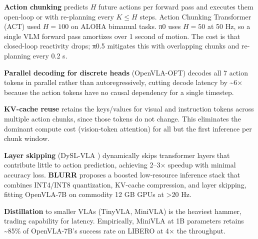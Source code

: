 \documentclass{article}
\begin{document}
\textbf{Action chunking} \cite{zhao2023learningfinegraine,black20240avisionlanguageac} predicts \(H\) future actions per forward pass and executes them open-loop or with re-planning every \(K \le H\) steps. Action Chunking Transformer (ACT) used \(H=100\) on ALOHA bimanual tasks. π0 uses \(H = 50\) at 50 Hz, so a single VLM forward pass amortizes over 1 second of motion. The cost is that closed-loop reactivity drops; π0.5 mitigates this with overlapping chunks and re-planning every 0.2 s.

\textbf{Parallel decoding for discrete heads} (OpenVLA-OFT) decodes all 7 action tokens in parallel rather than autoregressively, cutting decode latency by \textasciitilde6× because the action tokens have no causal dependency for a single timestep.

\textbf{KV-cache reuse} retains the keys/values for visual and instruction tokens across multiple action chunks, since those tokens do not change. This eliminates the dominant compute cost (vision-token attention) for all but the first inference per chunk window.

\textbf{Layer skipping} (DySL-VLA \cite{yang2026dyslvlaefficientvi}) dynamically skips transformer layers that contribute little to action prediction, achieving 2--3× speedup with minimal accuracy loss. \textbf{BLURR} \cite{ma2025blurraboostedlowre} proposes a boosted low-resource inference stack that combines INT4/INT8 quantization, KV-cache compression, and layer skipping, fitting OpenVLA-7B on commodity 12 GB GPUs at \textgreater20 Hz.

\textbf{Distillation} to smaller VLAs (TinyVLA, MiniVLA) is the heaviest hammer, trading capability for latency. Empirically, MiniVLA at 1B parameters retains \textasciitilde85\% of OpenVLA-7B's success rate on LIBERO at 4× the throughput.
\end{document}
